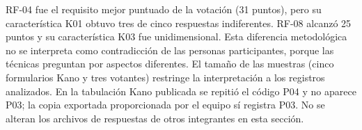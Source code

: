 

RF-04 fue el requisito mejor puntuado de la votación (31 puntos), pero su característica K01 obtuvo tres de cinco respuestas indiferentes. RF-08 alcanzó 25 puntos y su característica K03 fue unidimensional. Esta diferencia metodológica no se interpreta como contradicción de las personas participantes, porque las técnicas preguntan por aspectos diferentes. El tamaño de las muestras (cinco formularios Kano y tres votantes) restringe la interpretación a los registros analizados. En la tabulación Kano publicada se repitió el código P04 y no aparece P03; la copia exportada proporcionada por el equipo sí registra P03. No se alteran los archivos de respuestas de otros integrantes en esta sección.
